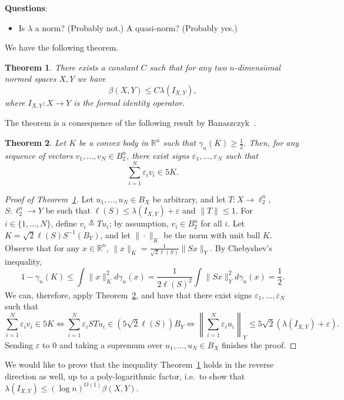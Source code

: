 \documentclass{article}
\newtheorem{theorem}{Theorem}
\newcommand{\R}{{\mathbb{R}}}
\newcommand\eps{\varepsilon}
\newcommand{\eqdef}{\triangleq}
\begin{document}
\medskip\noindent
\textbf{Questions}:
\begin{itemize}
\item Is $\lambda$ a norm? (Probably not.) A quasi-norm? (Probably yes.)
\end{itemize}


We have the following theorem.

\begin{theorem}\label{thm:factorization}
  There exists a constant $C$ such that for any two $n$-dimensional
  normed spaces $X, Y$ we have
  \[
  \beta(X,Y) \le C\lambda(I_{X,Y}),
  \]
  where $I_{X,Y}:X \to Y$ is the formal identity operator. 
\end{theorem}

The theorem is a consequence of the following result by Banaszczyk~\cite{bana}.
\begin{theorem}\label{thm:bana}
  Let $K$ be a convex body in $\R^n$ such that $\gamma_n(K) \ge
  \frac12$. Then, for any sequence of vectors $v_1, \ldots, v_N \in
  B_2^n$, there exist signs $\eps_1, \ldots, \eps_N$ such that
  \[
  \sum_{i = 1}^N{\eps_i v_i}\in 5K.
  \]
\end{theorem}

\begin{proof}[Proof of Theorem~\ref{thm:factorization}]
  Let $u_1, \ldots, u_N \in B_X$ be arbitrary, and let $T:X \to
  \ell_2^n$, $S:\ell_2^n \to Y$ be such that $\ell(S)\le
  \lambda(I_{X,Y}) + \eps$ and $\|T\| \le 1$. For $i \in \{1, \ldots,
  N\}$, define $v_i \eqdef Tu_i$; by assumption, $v_i \in B_2^n$ for
  all $i$. Let $K = \sqrt{2}\ell(S) S^{-1}(B_Y)$, and let
  $\|\cdot\|_K$ be the norm with unit ball $K$. Observe that for any
  $x \in \R^n$, $\|x\|_K = \frac{1}{\sqrt{2}\ell(S)}\|Sx\|_Y$. By
  Chebyshev's inequality,
  \[
  1 - \gamma_n(K) \le \int \|x\|_K^2 d\gamma_n(x)
  =
  \frac{1}{2\ell(S)^2} \int \|Sx\|_Y^2 d\gamma_n(x)
  = \frac{1}{2}.
  \]
  We can, therefore, apply Theorem~\ref{thm:bana}, and have that there
  exist signs $\eps_1, \ldots, \eps_N$ such that 
  \[
  \sum_{i =1}^N{\eps_i v_i} \in 5K
  \iff
  \sum_{i = 1}^N{\eps_i ST u_i} \in (5\sqrt{2}\ell(S))B_Y
  \iff 
  \left\|\sum_{i = 1}^N{\eps_i u_i}\right\|_Y \le 5\sqrt{2}(\lambda(I_{X,Y})
    + \eps).
  \]
  Sending $\eps$ to $0$ and taking a supremum over
  $u_1, \ldots, u_N \in B_X$  finishes the proof.
\end{proof}

We would like to prove that the inequality
Theorem~\ref{thm:factorization} holds in the reverse direction as
well, up to a poly-logarithmic factor, i.e.~to show that
$\lambda(I_{X,Y}) \le (\log n)^{O(1)}\beta(X,Y)$.
\end{document}
